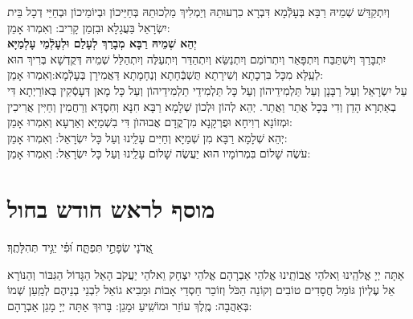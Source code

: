 \documentclass[twoside, openany, parskip=half, 11pt]{book}
\begin{document}
\begin{kaddish}

 וְיִתְקַדַּשׁ שְׁמֵיהּ רַבָּא בְּעָלְֿמָא דִּבְרָא כִרְעוּתֵהּ
וְיַמְלִיךְ מַלְכוּתֵהּ בְּחַיֵּיכוֹן וּבְיוֹמֵיכוֹן וּבְחַיֵּי דְכָל בֵּית יִשְׂרָאֵל בַּעֲגָלָא וּבִזְמַן קָרִיב: וְאִמְרוּ אָמֵן: \\
\textbf{יְהֵא שְׁמֵיהּ רַבָּא מְבָרַךְ לְעָלַם וּלְעָלְֿמֵי עָלְמַיָּא}\\
 יִתְבָּרַךְ וְיִשְׁתַּבַּח וְיִתְפָּאַר וְיִתְרוֹמַם וְיִתְנַשֵּׂא 
וְיִתְהַדַּר וְיִתְעַלֶּה וְיִתְהַלַּל שְׁמֵיהּ דְּקֻדְשָׁא בְּרִיךְ הוּא 
לְעֵֽלָּא מִכָּל בִּרְכָתָא וְשִׁירָתָא תֻּשְׁבְּֿחָתָא וְנֶחָמָתָא 
דַּאֲמִירָן בְּעָלְֿמָא:וְאִמְרוּ אָמֵן:\\
עַל יִשְׂרָאֵל וְעַל רַבָּנָן וְעַל תַּלְמִידֵיהוֹן וְעַל כָּל תַּלְמִידֵי תַלְמִידֵיהוֹן וְעַל כָּל מָאן דְּעָסְֿקִין בְּאוֹרַיְתָא דִּי בְאַתְרָא הָדֵן וְדִי בְּכָל אֲתַר וַאֲתַר. יְהֵא לְהוֹן וּלְכוֹן שְׁלָמָא רַבָּא חִנָּא וְחִסְדָּא וְרַחֲמִין וְחַיִּין אֲרִיכִין וּמְזוֹנָא רְוִיחָא וּפֻרְקָנָא מִן־קֳדָם אֲבוּהוׂן דִּי בִשְׁמַיָּא וְאַרְעָא וְאִמְרוּ אָמֵן:\\
יְהֵא שְׁלָמָא רַבָּא מִן שְׁמַיָּא וְחַיִּים עָלֵֽינוּ וְעַל כָּל יִשְׂרָאֵל: וְאִמְרוּ אָמֵן:\\
עֹשֶׂה שָׁלוֹם בִּמְרוֹמָיו הוּא יַעֲשֶׂה שָׁלוֹם עָלֵֽינוּ וְעַל כָּל יִשְׂרָאֵל: וְאִמְרוּ אָמֵן:
\end{kaddish}

\vfill
{}\quad{}\quad{}

\chapter[מוסף לראש חודש]{ מוסף לראש חודש בחול }
\label{musaphrh}




\newcommand{\specialsaavos}{
 \begin{small}
אֲ֭דֹנָי שְׂפָתַ֣י תִּפְתָּ֑ח וּ֝פִ֗י יַגִּ֥יד תְּהִלָּתֶֽךָ׃
\source{תהלים נא}\\
\end{small} 
 \firstword{בָּרוּךְ}
 אַתָּה יְיָ אֱלֹהֵֽינוּ וֵאלֹהֵי אֲבוֹתֵֽינוּ אֱלֹהֵי אַבְרָהָם אֱלֹהֵי יִצְחָק וֵאלֹהֵי יַעֲקֹב הָאֵל הַגָּדוֹל הַגִּבּוֹר וְהַנּוֹרָא אֵל עֶלְיוֹן גּוֹמֵל חֲסָדִים טוֹבִים וְקוֹנֵה הַכֹּל וְזוֹכֵר חַסְדֵי אָבוֹת וּמֵבִיא גוֹאֵל לִבְנֵי בְנֵיהֶם לְמַֽעַן שְׁמוֹ בְּאַהֲבָה: מֶֽלֶךְ עוֹזֵר וּמוֹשִֽׁיעַ וּמָגֵן: בָּרוּךְ אַתָּה יְיָ מָגֵן אַבְרָהָם:
}

\specialsaavos

\newcommand{\specialsameisim}{
\firstword{אַתָּה}
 גִּבּוֹר לְעוֹלָם אֲדֹנָי מְחַיֵּה מֵתִים אַתָּה רַב לְהוֹשִֽׁיעַ:

 \instruction{ממוסף של שמיני עצרת עד מוסף יום א' של פסח אומרים}\\
 מַשִּׁיב הָרֽוּחַ וּמוֹרִיד הַגֱּֽשֶׁם

\firstword{מְכַלְכֵּל}
 חַיִּים בְּחֶֽסֶד מְחַיֵּה מֵתִים בְּרַחֲמִים רַבִּים סוֹמֵךְ נוֹפְֿלִים וְרוֹפֵא חוֹלִים וּמַתִּיר אֲסוּרִים וּמְקַיֵּם אֱמוּנָתוֹ לִישֵׁנֵי עָפָר: מִי כָמֽוֹךָ בַּֽעַל גְּבוּרוֹת וּמִי דּֽוֹמֶה לָּךְ מֶֽלֶךְ מֵמִית וּמְחַיֶּה וּמַצְמִֽיחַ יְשׁוּעָה: וְנֶאֱמָן אַתָּה לְהַחֲיוֹת מֵתִים: בָּרוּךְ אַתָּה יְיָ מְחַיֵּה הַמֵּתִים:
}
\end{document}
